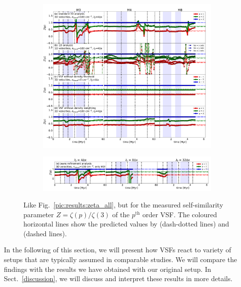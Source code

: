\begin{figure}[!htb]
	\centering  
  
  \begin{subfigure}[c]{\textwidth}
      \includegraphics[width=\textwidth]{z_all_nojeans.pdf}
      \label{pic:results:z_all_nojeans}
  \end{subfigure}
  
  \begin{subfigure}[c]{\textwidth}
      \addtocounter{subfigure}{4}
      \includegraphics[width=\textwidth]{z_jeans.pdf}
      \label{pic:results:z_all_jeans}
  \end{subfigure}
  
  \caption{Like Fig.~\ref{pic:results:zeta_all}, but for the measured self-similarity parameter $Z = \zeta(p) / \zeta(3)$ of the $p^\mathrm{th}$ order VSF. The coloured horizontal lines show the predicted values by \citet{She1994} (dash-dotted lines) and \citet{Boldyrev2002} (dashed lines).}
	\label{pic:results:z_all}
\end{figure}

In the following of this section, we will present how VSFs react to variety of setups that are typically assumed in comparable studies.
We will compare the findings with the results we have obtained with our original setup.
In Sect.~\ref{discussion}, we will discuss and interpret these results in more details.


